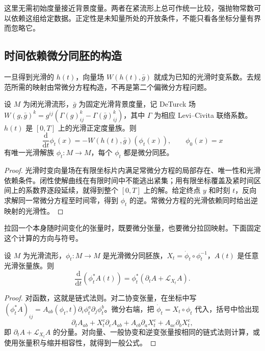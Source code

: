 这里无需初始度量接近背景度量。两者在紧流形上总可作统一比较，强抛物常数可以依赖这组给定数据。正定性是未知量所处的开放条件，不能只看各坐标分量有界而忽略它。

\subsection{时间依赖微分同胚的构造}
\label{g3:subsec:2702:02}
一旦得到光滑的 \(h(t)\)，向量场 \(W(h(t),\bar g)\) 就成为已知的光滑时变系数。去规范所需的映射由常微分方程构造，不再是第二个偏微分方程问题。

\begin{lemma}\label{g3:lem:ricci-gauge-diffeomorphisms}
 设 \(M\) 为闭光滑流形，\(\bar g\) 为固定光滑背景度量，记 DeTurck 场 \(W(g,\bar g)^k=g^{ij}(\Gamma(g)^k_{ij}-\Gamma(\bar g)^k_{ij})\)，其中 \(\Gamma\) 为相应 Levi--Civita 联络系数。\(h(t)\) 是 \([0,T]\) 上的光滑正定度量族。则
 \begin{equation}\label{g3:eq:ricci-gauge-ode}
  \frac{\mathrm d}{\mathrm dt}\phi_t(x)
   =-W(h(t),\bar g)(\phi_t(x)),\qquad\phi_0(x)=x
 \end{equation}
 有唯一光滑解族 \(\phi_t:M\to M\)，每个 \(\phi_t\) 都是微分同胚。
\end{lemma}
\begin{proof}
 光滑时变向量场在有限坐标片内满足常微分方程的局部存在、唯一性和光滑依赖条件。闭性使解曲线在有限时间中不能逃出紧集；用有限坐标覆盖及紧时间区间上的系数界逐段延续，就得到整个 \([0,T]\) 上的解。给定终点 \(y\) 和时刻 \(t\)，反向求解同一常微分方程至时间零，得到 \(\phi_t\) 的逆。常微分方程的光滑依赖同时给出逆映射的光滑性。
\end{proof}

拉回一个本身随时间变化的张量时，既要微分张量，也要微分拉回映射。下面固定这个计算的方向与符号。

\begin{lemma}\label{g3:lem:time-dependent-pullback}
 设 \(M\) 为光滑流形，\(\phi_t:M\to M\) 是光滑微分同胚族，\(X_t=\dot\phi_t\circ\phi_t^{-1}\)，\(A(t)\) 是任意光滑张量族。则
 \begin{equation}\label{g3:eq:time-dependent-pullback}
  \frac{\mathrm d}{\mathrm dt}(\phi_t^*A(t))
  =\phi_t^*(\partial_tA+\mathcal L_{X_t}A).
 \end{equation}
\end{lemma}
\begin{proof}
 对函数，这就是链式法则。对二协变张量，在坐标中写
 \((\phi_t^*A)_{ij}=A_{ab}(\phi_t,t)\partial_i\phi_t^a\partial_j\phi_t^b\)。微分右端，把 \(\dot\phi_t=X_t\circ\phi_t\) 代入，括号中恰出现
 \[
  \partial_tA_{ab}+X_t^c\partial_cA_{ab}
   +A_{cb}\partial_aX_t^c+A_{ac}\partial_bX_t^c,
 \]
 即 \(\partial_tA+\mathcal L_{X_t}A\) 的分量。对向量、一般协变和逆变张量按相同的链式法则计算，或使用张量积与缩并相容性，就得到一般公式。
\end{proof}

